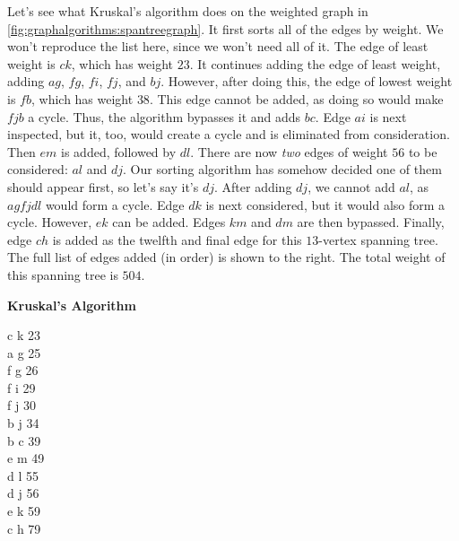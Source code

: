 \medskip
\noindent\begin{minipage}{0.70\textwidth}
\begin{example}
  Let's see what Kruskal's algorithm does on the weighted graph in
  \autoref{fig:graphalgorithms:spantreegraph}. It first sorts all of
  the edges by weight. We won't reproduce the list here, since we
  won't need all of it. The edge of least weight is $ck$, which has
  weight $23$. It continues adding the edge of least weight, adding
  $ag$, $fg$, $fi$, $fj$, and $bj$. However, after doing this, the
  edge of lowest weight is $fb$, which has weight $38$. This edge
  cannot be added, as doing so would make $fjb$ a cycle. Thus, the
  algorithm bypasses it and adds $bc$. Edge $ai$ is next inspected,
  but it, too, would create a cycle and is eliminated from
  consideration. Then $em$ is added, followed by $dl$. There are now
  \emph{two} edges of weight $56$ to be considered: $al$ and $dj$. Our
  sorting algorithm has somehow decided one of them should appear
  first, so let's say it's $dj$. After adding $dj$, we cannot add
  $al$, as $agfjdl$ would form a cycle. Edge $dk$ is next considered,
  but it would also form a cycle. However, $ek$ can be added. Edges
  $km$ and $dm$ are then bypassed. Finally, edge $ch$ is added as the
  twelfth and final edge for this $13$-vertex spanning tree. The full
  list of edges added (in order) is shown to the right. The total
  weight of this spanning tree is $504$.\end{example}
\end{minipage}\hspace{.03\textwidth}
\begin{minipage}{.25\textwidth}
\begin{center}\textbf{Kruskal's Algorithm}\\%
  \begin{tt}c k 23\\%
     a g 25\\%
     f g 26\\%
     f i 29\\%
     f j 30\\%
     b j 34\\%
     b c 39\\%
     e m 49\\%
     d l 55\\%
     d j 56\\%
     e k 59\\%
     c h 79\end{tt}\end{center}\end{minipage}
